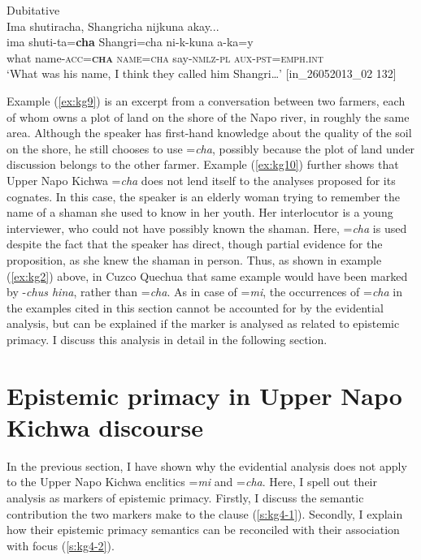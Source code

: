 \documentclass[output=paper]{langscibook}
\begin{document}
\begin{exe}
	\ex Dubitative\label{ex:kg10}\\
	\glll Ima shutiracha, Shangricha nijkuna akay...\\
	ima shuti-ta=\textbf{cha} Shangri=cha ni-k-kuna a-ka=y\\
	what name-\textsc{acc}=\textbf{\textsc{cha}} \textsc{name}=\textsc{cha} say-\textsc{nmlz}-\textsc{pl} \textsc{aux}-\textsc{pst}=\textsc{emph}.\textsc{int}\\
	\trans ‘What was his name, I think they called him Shangri…’ [in\_26052013\_02 132]
\end{exe}

Example ‎(\ref{ex:kg9}) is an excerpt from a conversation between two farmers, each of whom owns a plot of land on the shore of the Napo river, in roughly the same area. Although the speaker has first-hand knowledge about the quality of the soil on the shore, he still chooses to use =\textit{cha}, possibly because the plot of land under discussion belongs to the other farmer. Example ‎(\ref{ex:kg10}) further shows that Upper Napo Kichwa =\textit{cha} does not lend itself to the analyses proposed for its cognates. In this case, the speaker is an elderly woman trying to remember the name of a shaman she used to know in her youth. Her interlocutor is a young interviewer, who could not have possibly known the shaman. Here, =\textit{cha} is used despite the fact that the speaker has direct, though partial evidence for the proposition, as she knew the shaman in person. Thus, as shown in example ‎(\ref{ex:kg2}) above, in Cuzco Quechua that same example would have been marked by -\textit{chus hina}, rather than =\textit{cha}. As in case of =\textit{mi}, the occurrences of =\textit{cha} in the examples cited in this section cannot be accounted for by the evidential analysis, but can be explained if the marker is analysed as related to epistemic primacy. I discuss this analysis in detail in the following section.

\section{Epistemic primacy in Upper Napo Kichwa discourse}\label{s:kg4}

In the previous section, I have shown why the evidential analysis does not apply to the Upper Napo Kichwa enclitics =\textit{mi} and =\textit{cha}. Here, I spell out their analysis as markers of epistemic primacy. Firstly, I discuss the semantic contribution the two markers make to the clause (‎\ref{s:kg4-1}). Secondly, I explain how their epistemic primacy semantics can be reconciled with their association with focus (\ref{s:kg4-2}).
\end{document}
